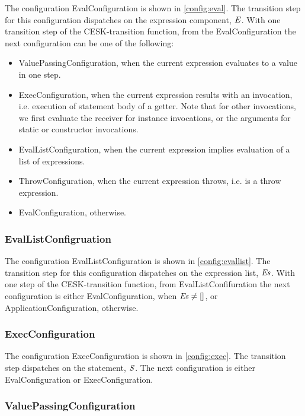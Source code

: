 \documentclass{article}
\begin{document}
The configuration EvalConfiguration is shown in \ref{config:eval}. 
The transition step for this configuration dispatches on the expression component, $\mathit{E}$.
With one transition step of the CESK-transition function, from the EvalConfiguration the next configuration can be one of the following:
\begin{itemize}
\item ValuePassingConfiguration, when the current expression evaluates to a value in one step.
\item ExecConfiguration, when the current expression results with an invocation, i.e. execution of statement body of a getter.
Note that for other invocations, we first evaluate the receiver for instance invocations, or the arguments for static or constructor invocations.
\item EvalListConfiguration, when the current expression implies evaluation of a list of expressions.
\item ThrowConfiguration, when the current expression throws, i.e. is a throw expression.
\item EvalConfiguration, otherwise.
\end{itemize}

\subsubsection{EvalListConfigruation}
\label{subsubsec:evallistconfig}
The configuration EvalListConfiguration is shown in \ref{config:evallist}.
The transition step for this configuration dispatches on the expression list, $\mathit{E}\mathit{s}$.
With one step of the CESK-transition function, from EvalListConfifuration the next configuration is either EvalConfiguration, when $\mathit{E}\mathit{s} \neq []$, or ApplicationConfiguration, otherwise.

\subsubsection{ExecConfiguration}
\label{subsubsec:execconfig}

The configuration ExecConfiguration is shown in \ref{config:exec}.
The transition step dispatches on the statement, $\mathit{S}$.
The next configuration is either EvalConfiguration or ExecConfiguration.

\subsubsection{ValuePassingConfiguration}
\label{suubsubsec:valuepassingconfig}
\end{document}
